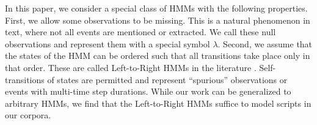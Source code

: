 \documentclass[letterpaper]{article}
\begin{document}
In this paper, we consider a special class of HMMs with the following 
properties. %
First, we allow some observations to be missing. This is a natural phenomenon in text, where not all events are mentioned or extracted. We call these null observations and represent them with a special symbol $\lambda$.  Second, we assume that the states of the HMM can be ordered such that all transitions take place only in that order. These are called Left-to-Right HMMs in the literature \cite{rabiner,bahl}. Self-transitions of states are permitted and represent ``spurious'' observations or events with multi-time step durations. While our work can be generalized to arbitrary HMMs, we find that the Left-to-Right HMMs suffice to model scripts in our corpora.  %
\end{document}
